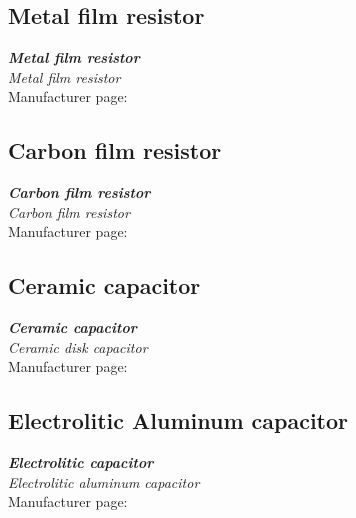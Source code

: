 \subsection{Metal film resistor}
\label{datasheet_METALFILMRESISTOR}
\emph{\textbf{Metal film resistor}}\\
\emph{Metal film resistor}\\
\vspace{5pt}
Manufacturer page:	\\


\subsection{Carbon film resistor}
\label{datasheet_CARBONFILMRESISTOR}
\emph{\textbf{Carbon film resistor}}\\
\emph{Carbon film resistor}\\
\vspace{5pt}
Manufacturer page:	\\



\subsection{Ceramic capacitor}
\label{datasheet_CERAMIC_CAPACITOR}
\emph{\textbf{Ceramic capacitor}}\\
\emph{Ceramic disk capacitor}\\
\vspace{5pt}
Manufacturer page:	\\


\subsection{Electrolitic Aluminum capacitor}
\label{datasheet_ELECTROLITIC_CAPACITOR}
\emph{\textbf{Electrolitic capacitor}}\\
\emph{Electrolitic aluminum capacitor}\\
\vspace{5pt}
Manufacturer page:	\\








